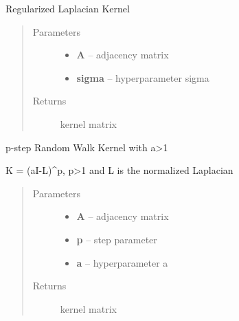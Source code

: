 \documentclass[letterpaper,10pt,english]{sphinxmanual}
\begin{document}
\begin{fulllineitems}
\label{pyGPs.GraphExtensions:pyGPs.GraphExtensions.nodeKernels.regLapKernel}
Regularized Laplacian Kernel
\begin{quote}\begin{description}
\item[{Parameters}] \leavevmode\begin{itemize}
\item {} 
\textbf{A} -- adjacency matrix

\item {} 
\textbf{sigma} -- hyperparameter sigma

\end{itemize}

\item[{Returns}] \leavevmode
kernel matrix

\end{description}\end{quote}

\end{fulllineitems}


\begin{fulllineitems}
\label{pyGPs.GraphExtensions:pyGPs.GraphExtensions.nodeKernels.rwKernel}
p-step Random Walk Kernel with a\textgreater{}1

K = (aI-L)\textasciicircum{}p, p\textgreater{}1 and L is the normalized Laplacian
\begin{quote}\begin{description}
\item[{Parameters}] \leavevmode\begin{itemize}
\item {} 
\textbf{A} -- adjacency matrix

\item {} 
\textbf{p} -- step parameter

\item {} 
\textbf{a} -- hyperparameter a

\end{itemize}

\item[{Returns}] \leavevmode
kernel matrix

\end{description}\end{quote}

\end{fulllineitems}
\end{document}
